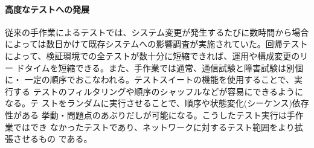    \paragraph{高度なテストへの発展}
従来の手作業によるテストでは、システム変更が発生するたびに数時間から場合
によっては数日かけて既存システムへの影響調査が実施されていた。回帰テスト
によって、検証環境での全テストが数十分に短縮できれば、運用や構成変更のリー
ドタイムを短縮できる。また、手作業では通常、通信試験と障害試験は別個に・
一定の順序でおこなわれる。テストスイートの機能を使用することで、実行する
テストのフィルタリングや順序のシャッフルなどが容易にできるようになる。テ
ストをランダムに実行させることで、順序や状態変化(シーケンス)依存性がある
挙動・問題点のあぶりだしが可能になる。こうしたテスト実行は手作業ではでき
なかったテストであり、ネットワークに対するテスト範囲をより拡張させるもの
である。

